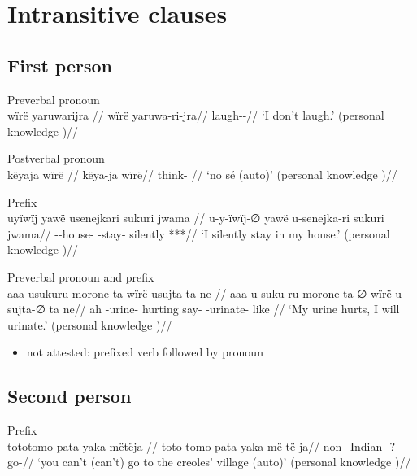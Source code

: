 \documentclass{memoir}
\begin{document}
\section{Intransitive clauses}

\subsection{First person}

\ex  Preverbal pronoun  \\\label{convrisamaj-4}
\begingl \glpreamble wïrë yaruwarijra //
\gla wïrë yaruwa-ri-jra//
\glb {} laugh--//
\glft ‘I don’t laugh.’ (personal knowledge
)//
\endgl
\xe

\ex  Postverbal pronoun  \\\label{convfemgrme-298}
\begingl \glpreamble këyaja wïrë //
\gla këya-ja wïrë//
\glb think- //
\glft ‘no sé (auto)’ (personal knowledge
)//
\endgl
\xe

\ex  Prefix  \\\label{convrisamaj-28}
\begingl \glpreamble uyïwïj yawë usenejkari sukuri jwama //
\gla u-y-ïwïj-∅ yawë u-senejka-ri sukuri jwama//
\glb {}--house-  -stay- silently ***//
\glft ‘I silently stay in my house.’ (personal knowledge
)//
\endgl
\xe

\ex  Preverbal pronoun and prefix  \\\label{ctorat-23}
\begingl \glpreamble aaa usukuru morone ta wïrë usujta ta ne //
\gla aaa u-suku-ru morone ta-∅ wïrë u-sujta-∅ ta ne//
\glb ah -urine- hurting say-  -urinate- like //
\glft ‘My urine hurts, I will urinate.’ (personal knowledge
)//
\endgl
\xe

\begin{itemize}
\tightlist
\item
  not attested: prefixed verb followed by pronoun
\end{itemize}

\subsection{Second person}

\ex  Prefix  \\\label{convamgu-7}
\begingl \glpreamble tototomo pata yaka mëtëja //
\gla toto-tomo pata yaka më-të-ja//
\glb non\_Indian- ?  -go-//
\glft ‘you can't (can't) go to the creoles' village (auto)’ (personal knowledge
)//
\endgl
\xe
\end{document}
